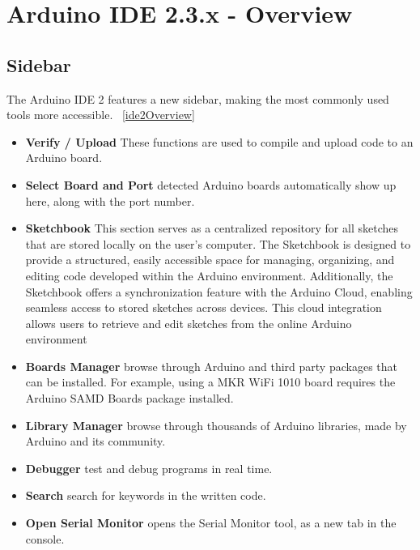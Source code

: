 %
%
%


\chapter{Arduino IDE 2.3.x - Overview }\label{ArduinoIDE2Overview}

\section{Sidebar}

The Arduino IDE 2 features a new sidebar, making the most commonly used tools more accessible. ~\ref{ide2Overview} \cite{arduinodescription:2024}

\begin{itemize}

    \item \textbf{Verify / Upload} These functions are used to compile and upload code to an Arduino board.
    \item \textbf{Select Board and Port} detected Arduino boards automatically show up here, along with the port number.
    \item \textbf{Sketchbook} This section serves as a centralized repository for all sketches that are stored locally on the user’s computer. The Sketchbook is designed to provide a structured, easily accessible space for managing, organizing, and editing code developed within the Arduino environment. Additionally, the Sketchbook offers a synchronization feature with the Arduino Cloud, enabling seamless access to stored sketches across devices. This cloud integration allows users to retrieve and edit sketches from the online Arduino environment
    \item \textbf{Boards Manager} browse through Arduino and third party packages that can be installed. For example, using a MKR WiFi 1010 board requires the Arduino SAMD Boards package installed.
    \item \textbf{Library Manager} browse through thousands of Arduino libraries, made by Arduino and its community.
    \item \textbf{Debugger} test and debug programs in real time.
    \item \textbf{Search} search for keywords in the written code.
    \item \textbf{Open Serial Monitor} opens the Serial Monitor tool, as a new tab in the console.
\end{itemize}


